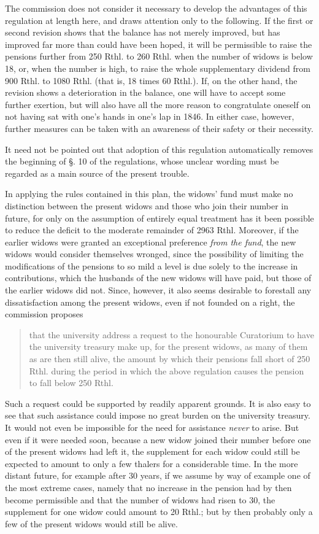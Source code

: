 The commission does not consider it necessary to develop the advantages of this regulation at length here, and draws attention only to the following. If the first or second revision shows that the balance has not merely improved, but has improved far more than could have been hoped, it will be permissible to raise the pensions further from 250 Rthl. to 260 Rthl. when the number of widows is below 18, or, when the number is high, to raise the whole supplementary dividend from 900 Rthl. to 1080 Rthl. (that is, 18 times 60 Rthl.). If, on the other hand, the revision shows a deterioration in the balance, one will have to accept some further exertion, but will also have all the more reason to congratulate oneself on not having sat with one's hands in one's lap in 1846. In either case, however, further measures can be taken with an awareness of their safety or their necessity.

It need not be pointed out that adoption of this regulation automatically removes the beginning of §. 10 of the regulations, whose unclear wording must be regarded as a main source of the present trouble.

In applying the rules contained in this plan, the widows' fund must make no
distinction between the present widows and those who join their number in future, for only on the assumption of entirely equal treatment has it been possible to reduce the deficit to the moderate remainder of 2963 Rthl. Moreover, if the earlier widows were granted an exceptional preference \textit{from the fund}, the new widows would consider themselves wronged, since the possibility of limiting the modifications of the pensions to so mild a level is due solely to the increase in contributions, which the husbands of the new widows will have paid, but those of the earlier widows did not. Since, however, it also seems desirable to forestall any dissatisfaction among the present widows, even if not founded on a right, the commission proposes
\begin{quote}
that the university address a request to the honourable Curatorium to have the university treasury make up, for the present widows, as many of them as are then still alive, the amount by which their pensions fall short of 250 Rthl. during the period in which the above regulation causes the pension to fall below 250 Rthl.
\end{quote}
\noindent\hspace*{\parindent}Such a request could be supported by readily apparent grounds. It is also easy to see that such assistance could impose no great burden on the university treasury. It would not even be impossible for the need for assistance \textit{never} to arise. But even if it were needed soon, because a new widow joined their number before one of the present widows had left it, the supplement for each widow could still be expected to amount to only a few thalers for a considerable time. In the more distant future, for example after 30 years, if we assume by way of example one of the most extreme cases, namely that no increase in the pension had by then become permissible and that the number of widows had risen to 30, the supplement for one widow could amount to 20 Rthl.; but by then probably only a few of the present widows would still be alive.

